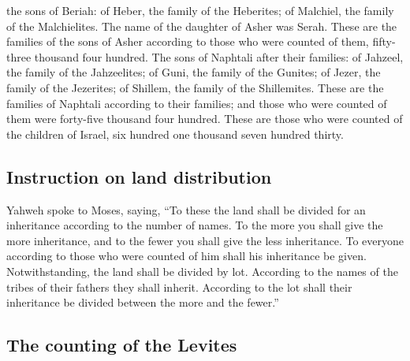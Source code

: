 the sons of Beriah: of Heber, the family of the Heberites; of Malchiel,
the family of the Malchielites.  The name of the daughter
of Asher was Serah.  These are the families of the sons
of Asher according to those who were counted of them, fifty-three
thousand four hundred.  The sons of Naphtali after their
families: of Jahzeel, the family of the Jahzeelites; of Guni, the family
of the Gunites;  of Jezer, the family of the Jezerites;
of Shillem, the family of the Shillemites.  These are the
families of Naphtali according to their families; and those who were
counted of them were forty-five thousand four hundred. 
These are those who were counted of the children of Israel, six hundred
one thousand seven hundred thirty.

\hypertarget{instruction-on-land-distribution}{%
\subsection{Instruction on land
distribution}\label{instruction-on-land-distribution}}

 Yahweh spoke to Moses, saying,  ``To
these the land shall be divided for an inheritance according to the
number of names.  To the more you shall give the more
inheritance, and to the fewer you shall give the less inheritance. To
everyone according to those who were counted of him shall his
inheritance be given.  Notwithstanding, the land shall be
divided by lot. According to the names of the tribes of their fathers
they shall inherit.  According to the lot shall their
inheritance be divided between the more and the fewer.''

\hypertarget{the-counting-of-the-levites}{%
\subsection{The counting of the
Levites}\label{the-counting-of-the-levites}}

